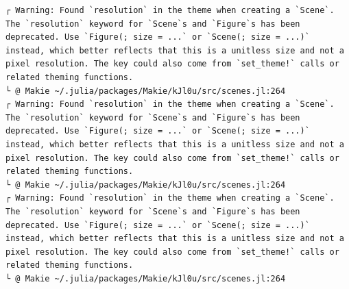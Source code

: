 \documentclass[
  english,
  russian,
  12pt,
  a4paper,
  DIV=11,
  numbers=noendperiod]{scrreprt}
\begin{document}
\begin{verbatim}
┌ Warning: Found `resolution` in the theme when creating a `Scene`. The `resolution` keyword for `Scene`s and `Figure`s has been deprecated. Use `Figure(; size = ...` or `Scene(; size = ...)` instead, which better reflects that this is a unitless size and not a pixel resolution. The key could also come from `set_theme!` calls or related theming functions.
└ @ Makie ~/.julia/packages/Makie/kJl0u/src/scenes.jl:264
┌ Warning: Found `resolution` in the theme when creating a `Scene`. The `resolution` keyword for `Scene`s and `Figure`s has been deprecated. Use `Figure(; size = ...` or `Scene(; size = ...)` instead, which better reflects that this is a unitless size and not a pixel resolution. The key could also come from `set_theme!` calls or related theming functions.
└ @ Makie ~/.julia/packages/Makie/kJl0u/src/scenes.jl:264
┌ Warning: Found `resolution` in the theme when creating a `Scene`. The `resolution` keyword for `Scene`s and `Figure`s has been deprecated. Use `Figure(; size = ...` or `Scene(; size = ...)` instead, which better reflects that this is a unitless size and not a pixel resolution. The key could also come from `set_theme!` calls or related theming functions.
└ @ Makie ~/.julia/packages/Makie/kJl0u/src/scenes.jl:264
\end{verbatim}
\end{document}
